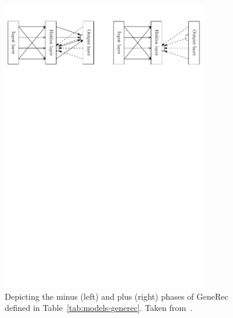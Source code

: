 \begin{figure}[H]
  \centering
  \includegraphics[width=0.8\textwidth]{img/models-generec-phase.pdf}
  
  \caption{Depicting the minus (left) and plus (right) phases of GeneRec defined in Table~\ref{tab:models-generec}. Taken from~\citet{orru2008sabio}.} 
  \label{fig:models-generec-phase}
\end{figure}

